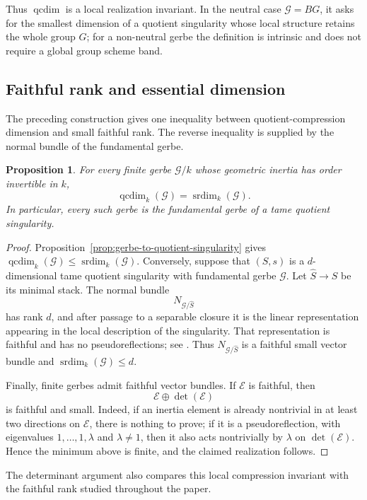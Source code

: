 \documentclass[11pt,reqno]{amsart}
\numberwithin{equation}{section}
\theoremstyle{plain}
\newtheorem{prop}{Proposition}[section]
\theoremstyle{definition}
\def\cG{{\mathcal G}}
\def\cE{{\mathcal E}}
\begin{document}
Thus $\operatorname{qcdim}$ is a local realization invariant.  In the neutral
case $\cG=BG$, it asks for the smallest dimension of a quotient singularity
whose local structure retains the whole group $G$; for a non-neutral
gerbe the definition is intrinsic and does not require a global group scheme band.

\subsection{Faithful rank and essential dimension}

The preceding construction gives one inequality between quotient-compression
dimension and small faithful rank.  The reverse inequality is supplied by the
normal bundle of the fundamental gerbe.

\begin{prop}\label{prop:qcdim-small-rank}
For every finite gerbe $\cG/k$ whose geometric inertia has order invertible in
$k$,
\[
\operatorname{qcdim}_k(\cG)=\operatorname{srdim}_k(\cG).
\]
In particular, every such gerbe is the fundamental gerbe of a tame quotient
singularity.
\end{prop}

\begin{proof}
Proposition~\ref{prop:gerbe-to-quotient-singularity} gives
$\operatorname{qcdim}_k(\cG)\le\operatorname{srdim}_k(\cG)$.
Conversely, suppose that $(S,s)$ is a $d$-dimensional tame quotient
singularity with fundamental gerbe $\cG$.  Let $\widehat S\to S$ be its
minimal stack.  The normal bundle
\[
N_{\cG/\widehat S}
\]
has rank $d$, and after passage to a separable closure it is the linear
representation appearing in the local description of the singularity.  That
representation is faithful and has no pseudoreflections; see
\cite[Corollary~6.4 and Section~6.4]{Bresciani_Vistoli_2024}.  Thus
$N_{\cG/\widehat S}$ is a faithful small vector bundle and
$\operatorname{srdim}_k(\cG)\le d$.

Finally, finite gerbes admit faithful vector bundles.  If $\cE$ is faithful,
then
\[
\cE\oplus\det(\cE)
\]
is faithful and small.  Indeed, if an inertia element is already nontrivial in
at least two directions on $\cE$, there is nothing to prove; if it is a
pseudoreflection, with eigenvalues $1,\ldots,1,\lambda$ and $\lambda\ne1$,
then it also acts nontrivially by $\lambda$ on $\det(\cE)$.  Hence the minimum
above is finite, and the claimed realization follows.
\end{proof}

The determinant argument also compares this local compression invariant with
the faithful rank studied throughout the paper.
\end{document}
